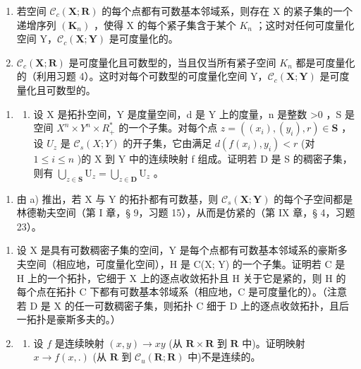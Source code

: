 \begin{enumerate}
\def\labelenumi{\alph{enumi})}
\tightlist
\item
  若空间 \(\mathcal{C}_{c}(\mathbf{X};\mathbf{R})\) 的每个点都有可数基本邻域系，则存在 X 的紧子集的一个递增序列 \((\mathbf{K}_{n})\) ，使得 X 的每个紧子集含于某个 \(K_{n}\) ；这时对任何可度量化空间 Y，\(\mathcal{C}_{c}(\mathbf{X};\mathbf{Y})\) 是可度量化的。
\item
  \(\mathcal{C}_{c}(\mathbf{X};\mathbf{R})\) 是可度量化且可数型的，当且仅当所有紧子空间 \(K_{n}\) 都是可度量化的（利用习题 4）。这时对每个可数型的可度量化空间 Y，\(\mathcal{C}_{c}(\mathbf{X};\mathbf{Y})\) 是可度量化且可数型的。
\end{enumerate}

\begin{enumerate}
\def\labelenumi{\arabic{enumi})}
\setcounter{enumi}{5}
\tightlist
\item
  \begin{enumerate}
  \def\labelenumii{\alph{enumii})}
  \tightlist
  \item
    设 X 是拓扑空间，Y 是度量空间，d 是 Y 上的度量，n 是整数 \textgreater0 ，S 是空间 \(X^{n} \times Y^{n} \times R_{+}^{*}\) 的一个子集。对每个点 \(z = ((x_{i}), (y_{i}), r) \in \mathbf{S}\) ，设 \(U_{z}\) 是 \(\mathcal{C}_{s}(X; Y)\) 的开子集，它由满足 \(d(f(x_i), y_i) < r\) (对 \(1 \leqslant i \leqslant n\) )的 X 到 Y 中的连续映射 f 组成。证明若 D 是 S 的稠密子集，则有 \(\bigcup_{z \in \mathbf{S}} \mathrm{U}_z = \bigcup_{z \in \mathbf{D}} \mathrm{U}_z\) 。
  \end{enumerate}
\end{enumerate}

\begin{enumerate}
\def\labelenumi{\alph{enumi})}
\setcounter{enumi}{1}
\tightlist
\item
  由 a) 推出，若 X 与 Y 的拓扑都有可数基，则 \(\mathcal{C}_{s}(\mathbf{X};\mathbf{Y})\) 的每个子空间都是林德勒夫空间（第 I 章，§ 9，习题 15），从而是仿紧的（第 IX 章，§ 4，习题 23）。
\end{enumerate}

\begin{enumerate}
\def\labelenumi{\arabic{enumi})}
\setcounter{enumi}{6}
\item
  设 X 是具有可数稠密子集的空间，Y 是每个点都有可数基本邻域系的豪斯多夫空间（相应地，可度量化空间），H 是 C(X; Y) 的一个子集。证明若 C 是 H 上的一个拓扑，它细于 X 上的逐点收敛拓扑且 H 关于它是紧的，则 H 的每个点在拓扑 C 下都有可数基本邻域系（相应地，C 是可度量化的）。（注意若 D 是 X 的任一可数稠密子集，则拓扑 C 细于 D 上的逐点收敛拓扑，且后一拓扑是豪斯多夫的。）
\item
  \begin{enumerate}
  \def\labelenumii{\alph{enumii})}
  \tightlist
  \item
    设 \(f\) 是连续映射 \((x, y) \to xy\) (从 \(\mathbf{R} \times \mathbf{R}\) 到 \(\mathbf{R}\) 中)。证明映射 \(x \to f(x, .)\) (从 \(\mathbf{R}\) 到 \(\mathcal{C}_u(\mathbf{R}; \mathbf{R})\) 中)不是连续的。
  \end{enumerate}
\end{enumerate}

